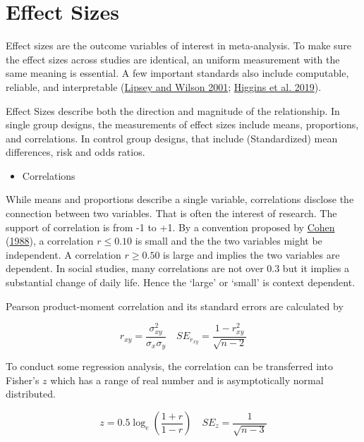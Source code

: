 \documentclass[
  11pt,
  openany]{memoir}
\providecommand{\tightlist}{%
  \setlength{\itemsep}{0pt}\setlength{\parskip}{0pt}}
\begin{document}
\hypertarget{effect-sizes}{%
\section{Effect Sizes}\label{effect-sizes}}

Effect sizes are the outcome variables of interest in meta-analysis.
To make sure the effect sizes across studies are identical, an uniform measurement with the same meaning is essential.
A few important standards also include computable, reliable, and interpretable (\protect\hyperlink{ref-lipseyPracticalMetaanalysis2001}{Lipsey and Wilson 2001}; \protect\hyperlink{ref-higginsCochraneHandbookSystematic2019}{Higgins et al. 2019}).

Effect Sizes describe both the direction and magnitude of the relationship.
In single group designs, the measurements of effect sizes include means, proportions, and correlations.
In control group designs, that include (Standardized) mean differences, risk and odds ratios.

\begin{itemize}
\tightlist
\item
  Correlations
\end{itemize}

While means and proportions describe a single variable, correlations disclose the connection between two variables. That is often the interest of research. The support of correlation is from -1 to +1.
By a convention proposed by \protect\hyperlink{ref-cohenStatisticalPowerAnalysis1988}{Cohen} (\protect\hyperlink{ref-cohenStatisticalPowerAnalysis1988}{1988}), a correlation \(r\le 0.10\) is small and the the two variables might be independent. A correlation \(r\ge 0.50\) is large and implies the two variables are dependent.
In social studies, many correlations are not over \(0.3\) but it implies a substantial change of daily life. Hence the `large' or `small' is context dependent.

Pearson product-moment correlation and its standard errors are calculated by

\begin{equation}
r_{xy} = \frac{\sigma^{2}_{xy}}{\sigma_x \sigma_y}\quad SE_{r_{xy}} = \frac{1-r_{xy}^2}{\sqrt{n-2}}
\end{equation}

To conduct some regression analysis, the correlation can be transferred into Fisher's \(z\) which has a range of real number and is asymptotically normal distributed.

\begin{equation}
z = 0.5\log_{e}\left(\frac{1+r}{1-r}\right)\quad SE_{z} = \frac{1}{\sqrt{n-3}}
\end{equation}
\end{document}
